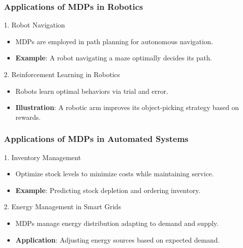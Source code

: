 \documentclass[aspectratio=169]{beamer}
\begin{document}
\begin{frame}[fragile]
    \frametitle{Applications of MDPs in Robotics}
    \begin{block}{1. Robot Navigation}
        \begin{itemize}
            \item MDPs are employed in path planning for autonomous navigation.
            \item \textbf{Example}: A robot navigating a maze optimally decides its path.
        \end{itemize}
    \end{block}

    \begin{block}{2. Reinforcement Learning in Robotics}
        \begin{itemize}
            \item Robots learn optimal behaviors via trial and error.
            \item \textbf{Illustration}: A robotic arm improves its object-picking strategy based on rewards.
        \end{itemize}
    \end{block}
\end{frame}

\begin{frame}[fragile]
    \frametitle{Applications of MDPs in Automated Systems}
    \begin{block}{1. Inventory Management}
        \begin{itemize}
            \item Optimize stock levels to minimize costs while maintaining service.
            \item \textbf{Example}: Predicting stock depletion and ordering inventory.
        \end{itemize}
    \end{block}

    \begin{block}{2. Energy Management in Smart Grids}
        \begin{itemize}
            \item MDPs manage energy distribution adapting to demand and supply.
            \item \textbf{Application}: Adjusting energy sources based on expected demand.
        \end{itemize}
    \end{block}
\end{frame}
\end{document}

